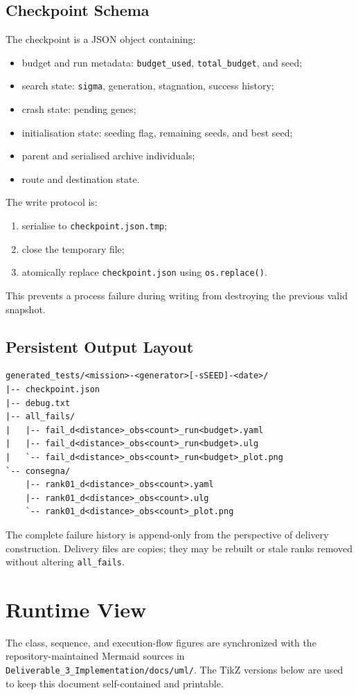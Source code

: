 \documentclass[11pt,a4paper,openany]{report}
\newcommand{\code}[1]{\texttt{#1}}
\begin{document}
\subsection{Checkpoint Schema}
The checkpoint is a JSON object containing:
\begin{itemize}
  \item budget and run metadata: \code{budget\_used}, \code{total\_budget}, and seed;
  \item search state: \code{sigma}, generation, stagnation, success history;
  \item crash state: pending genes;
  \item initialisation state: seeding flag, remaining seeds, and best seed;
  \item parent and serialised archive individuals;
  \item route and destination state.
\end{itemize}

The write protocol is:
\begin{enumerate}
  \item serialise to \code{checkpoint.json.tmp};
  \item close the temporary file;
  \item atomically replace \code{checkpoint.json} using \code{os.replace()}.
\end{enumerate}
This prevents a process failure during writing from destroying the previous valid snapshot.

\subsection{Persistent Output Layout}
\begin{lstlisting}[language={}]
generated_tests/<mission>-<generator>[-sSEED]-<date>/
|-- checkpoint.json
|-- debug.txt
|-- all_fails/
|   |-- fail_d<distance>_obs<count>_run<budget>.yaml
|   |-- fail_d<distance>_obs<count>_run<budget>.ulg
|   `-- fail_d<distance>_obs<count>_run<budget>_plot.png
`-- consegna/
    |-- rank01_d<distance>_obs<count>.yaml
    |-- rank01_d<distance>_obs<count>.ulg
    `-- rank01_d<distance>_obs<count>_plot.png
\end{lstlisting}

The complete failure history is append-only from the perspective of delivery construction. Delivery files are copies; they may be rebuilt or stale ranks removed without altering \code{all\_fails}.

\section{Runtime View}
The class, sequence, and execution-flow figures are synchronized with the repository-maintained Mermaid sources in \texttt{Deliverable\_3\_Implementation/docs/uml/}. The TikZ versions below are used to keep this document self-contained and printable.
\end{document}
